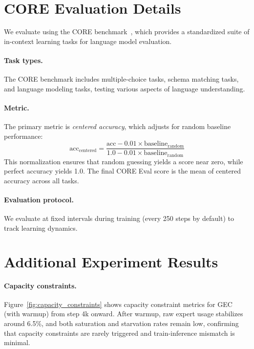 \documentclass{article}
\theoremstyle{plain}
\theoremstyle{definition}
\theoremstyle{remark}
\begin{document}
\section{CORE Evaluation Details}
\label{app:coreeval}

We evaluate using the CORE benchmark~\cite{li2024dclm}, which provides a standardized suite of in-context learning tasks for language model evaluation.

\paragraph{Task types.} The CORE benchmark includes multiple-choice tasks, schema matching tasks, and language modeling tasks, testing various aspects of language understanding.

\paragraph{Metric.} The primary metric is \emph{centered accuracy}, which adjusts for random baseline performance:
\begin{equation}
\text{acc}_{\text{centered}} = \frac{\text{acc} - 0.01 \times \text{baseline}_{\text{random}}}{1.0 - 0.01 \times \text{baseline}_{\text{random}}}
\end{equation}
This normalization ensures that random guessing yields a score near zero, while perfect accuracy yields 1.0. The final CORE Eval score is the mean of centered accuracy across all tasks.

\paragraph{Evaluation protocol.} We evaluate at fixed intervals during training (every 250 steps by default) to track learning dynamics.


\section{Additional Experiment Results}
\label{app:additional_results}

\paragraph{Capacity constraints.}
Figure~\ref{fig:capacity_constraints} shows capacity constraint metrics for GEC (with warmup) from step 4k onward. After warmup, raw expert usage stabilizes around 6.5\%, and both saturation and starvation rates remain low, confirming that capacity constraints are rarely triggered and train-inference mismatch is minimal.
\end{document}
